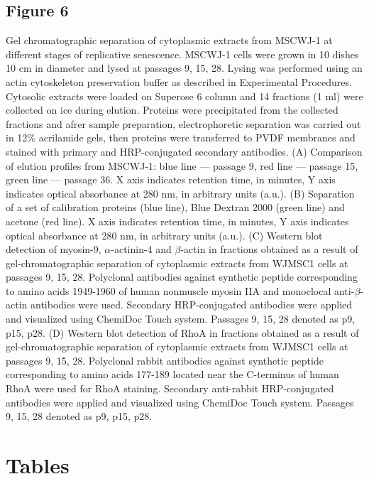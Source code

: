 \documentclass[alpha-refs]{wiley-article}
\begin{document}
\subsection*{Figure 6}
Gel chromatographic separation of cytoplasmic extracts from MSCWJ-1 at different stages of replicative senescence.
MSCWJ-1 cells were grown in 10 dishes 10 cm in diameter and lysed at passages  9, 15, 28.
Lysing was performed using an actin cytoskeleton preservation buffer as described in Experimental Procedures.
Cytosolic extracts were loaded on Superose 6 column and 14 fractions (1 ml) were collected on ice during elution.
Proteins were precipitated from the collected fractions and afrer sample preparation, electrophoretic separation was carried out in 12\% acrilamide gels, then proteins were transferred to PVDF membranes and stained with primary and HRP-conjugated secondary antibodies.
(A) Comparison of elution profiles from MSCWJ-1: blue line --- passage 9, red line --- passage 15, green line --- passage 36.
X axis indicates retention time, in minutes, Y axis indicates optical absorbance at 280 nm, in arbitrary units (a.u.).
(B) Separation of a set of calibration proteins (blue line), Blue Dextran 2000 (green line) and acetone (red line).
X axis indicates retention time, in minutes, Y axis indicates optical absorbance at 280 nm, in arbitrary units (a.u.).
(C) Western blot detection of myosin-9, $\alpha$-actinin-4 and $\beta$-actin in fractions obtained as a result of gel-chromatographic separation of cytoplasmic extracts from WJMSC1 cells at passages 9, 15, 28.
Polyclonal antibodies against synthetic peptide corresponding to amino acids 1949-1960 of human nonmuscle myosin IIA and monoclocal anti-$\beta$-actin antibodies were used.
Secondary HRP-conjugated antibodies were applied and visualized using ChemiDoc Touch system.
Passages 9, 15, 28 denoted as p9, p15, p28.
(D) Western blot detection of RhoA in fractions obtained as a result of gel-chromatographic separation of cytoplasmic extracts from WJMSC1 cells at passages 9, 15, 28.
Polyclonal rabbit antibodies against synthetic peptide corresponding to amino acids 177-189 located near the C-terminus of human RhoA were used for RhoA staining.
Secondary anti-rabbit HRP-conjugated antibodies were applied and visualized using ChemiDoc Touch system.
Passages 9, 15, 28 denoted as p9, p15, p28.

\section*{Tables}
\end{document}
